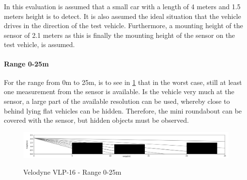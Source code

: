 \documentclass[11pt,oneside,openright]{mpreport}
\begin{document}

In this evaluation is assumed that a small car with a length of 4 meters and 1.5 meters height is to detect.
It is also assumed the ideal situation that the vehicle drives in the direction of the test vehicle.
Furthermore, a mounting height of the sensor of 2.1 meters as this is finally the mounting height of the sensor on the test vehicle, is assumed.

\paragraph{Range 0-25m}

For the range from 0m to 25m, is to see in \cref{velodyne_range_25} that in the worst case, still at least one measurement from the sensor is available. 
Is the vehicle very much at the sensor, a large part of the available resolution can be used, whereby close to behind lying flat vehicles can be hidden. 
Therefore, the mini roundabout can be covered with the sensor, but hidden objects must be observed.

\begin{figure}[!ht]
\caption{Velodyne VLP-16 - Range 0-25m}
\includegraphics[width=\textwidth]{bilder/range_25.png}
\label{velodyne_range_25}
\end{figure}
\end{document}
